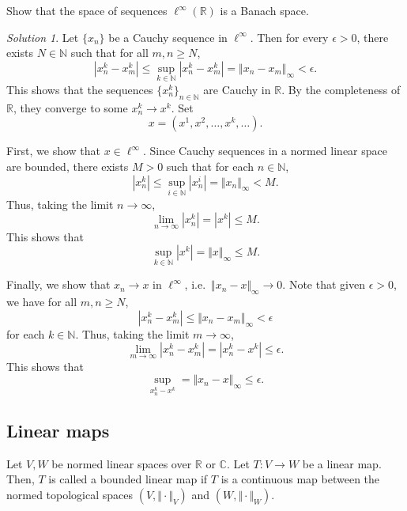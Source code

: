 \documentclass[11pt]{article}
\newcommand{\C}{\mathbb{C}}
\newcommand{\R}{\mathbb{R}}
\newcommand{\N}{\mathbb{N}}
\newcommand{\norm}[1]{\Vert #1 \Vert}
\theoremstyle{definition}
\theoremstyle{remark}
\newtheorem*{solution}{Solution}
\begin{document}
    \begin{exercise}
        Show that the space of sequences $\ell^\infty(\R)$ is a Banach space.
        \begin{solution}
            Let $\{x_n\}$ be a Cauchy sequence in $\ell^\infty$. Then for every
            $\epsilon > 0$, there exists $N \in \N$ such that for all $m, n \geq N$,
            \[
                |x_n^k - x_m^k| \leq \sup_{k \in \N} |x_n^k - x_m^k| = \norm{x_n -
                x_m}_\infty < \epsilon.
            \] This shows that the sequences $\{x_n^k\}_{n \in \N}$ are Cauchy in
            $\R$. By the completeness of $\R$, they converge to some $x_n^k \to x^k$.
            Set \[
                x = (x^1, x^2, \dots, x^k, \dots).
            \]

            First, we show that $x \in \ell^\infty$. Since Cauchy sequences in a
            normed linear space are bounded, there exists $M > 0$ such that for each
            $n \in \N$, \[
                |x_n^k| \leq \sup_{i \in \N} |x_n^i| = \norm{x_n}_\infty < M.
            \] Thus, taking the limit $n \to \infty$, \[
                \lim_{n \to \infty} |x_n^k| = |x^k| \leq M.
            \] This shows that \[
                \sup_{k \in \N} |x^k| = \norm{x}_\infty \leq M.
            \]

            Finally, we show that $x_n \to x$ in $\ell^\infty$, i.e.\ $\norm{x_n -
            x}_\infty \to 0$. Note that given $\epsilon > 0$, we have for all $m, n
            \geq N$, \[
                |x_n^k - x_m^k| \leq \norm{x_n - x_m}_\infty < \epsilon
            \] for each $k \in \N$. Thus, taking the limit $m \to \infty$, \[
                \lim_{m \to \infty} |x_n^k - x_m^k| = |x_n^k - x^k| \leq \epsilon.
            \] This shows that \[
                \sup_{x_n^k - x^k} = \norm{x_n - x}_\infty \leq \epsilon.
            \]
        \end{solution}
    \end{exercise}


    \subsection{Linear maps}

    \begin{definition}
        Let $V, W$ be normed linear spaces over $\R$ or $\C$. Let $T\colon V \to W$
        be a linear map. Then, $T$ is called a bounded linear map if $T$ is a
        continuous map between the normed topological spaces $(V, \norm{\cdot}_V)$
        and $(W, \norm{\cdot}_W)$.
    \end{definition}
\end{document}
